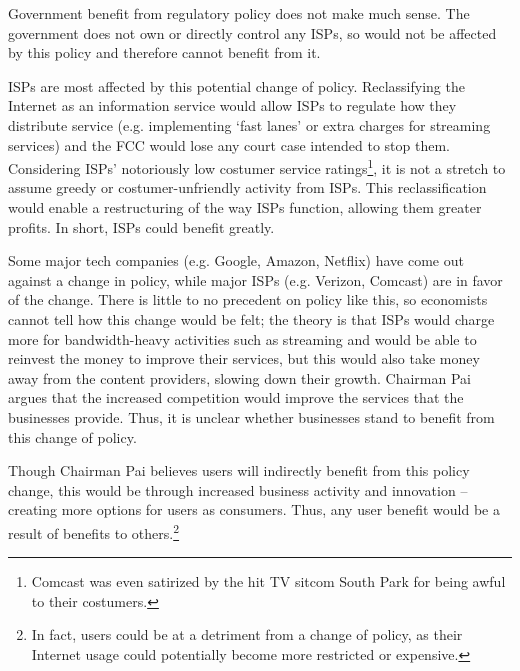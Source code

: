 \documentclass[12pt]{article}
\begin{document}
\begin{multicols}{2}
Government benefit from regulatory policy does not make much sense. The government does not own or directly control any ISPs, so would not be affected by this policy and therefore cannot benefit from it.

ISPs are most affected by this potential change of policy. Reclassifying the Internet as an information service would allow ISPs to regulate how they distribute service (e.g. implementing `fast lanes' or extra charges for streaming services) and the FCC would lose any court case intended to stop them.\cite{eff-pro-net} Considering ISPs' notoriously low costumer service ratings\footnote{Comcast was even satirized by the hit TV sitcom South Park for being awful to their costumers.}, it is not a stretch to assume greedy or costumer-unfriendly activity from ISPs.\cite{satisfaction} This reclassification would enable a restructuring of the way ISPs function, allowing them greater profits. In short, ISPs could benefit greatly.

Some major tech companies (e.g. Google, Amazon, Netflix) have come out against a change in policy, while major ISPs (e.g. Verizon, Comcast) are in favor of the change.\cite{ieee-article} There is little to no precedent on policy like this, so economists cannot tell how this change would be felt; the theory is that ISPs would charge more for bandwidth-heavy activities such as streaming and would be able to reinvest the money to improve their services, but this would also take money away from the content providers, slowing down their growth.\cite{ieee-article} Chairman Pai argues that the increased competition would improve the services that the businesses provide.\cite{pbs-pai-makes-case} Thus, it is unclear whether businesses stand to benefit from this change of policy.

Though Chairman Pai believes users will indirectly benefit from this policy change, this would be through increased business activity and innovation -- creating more options for users as consumers.\cite{pbs-pai-makes-case} Thus, any user benefit would be a result of benefits to others.\footnote{In fact, users could be at a detriment from a change of policy, as their Internet usage could potentially become more restricted or expensive.}


\end{multicols}
\end{document}
